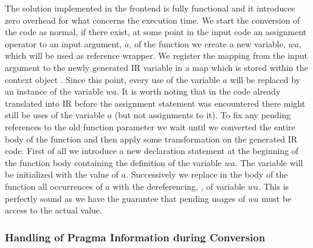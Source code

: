 The solution implemented in the frontend is fully functional and it introduces
zero overhead for what concerns the execution time. We start the conversion of
the code as normal, if there exist, at some point in the input code an
assignment operator to an input argument, $a$, of the function we create a new
variable, $wa$, which will be used as reference wrapper. We register the mapping
from the input argument to the newly generated IR variable in a map which is
stored within the context object . Since this point, every use
of the variable $a$ will be replaced by an instance of the variable $wa$. It is
worth noting that in the code already translated into IR before the assignment
statement was encountered there might still be uses of the variable $a$ (but not
assignments to it). To fix any pending references to the old function parameter
we wait until we converted the entire body of the function and then apply some
transformation on the generated IR code. First of all we introduce a new
declaration statement at the beginning of the function body containing the
definition of the variable $wa$. The variable will be initialized with the value
of $a$. Successively we replace in the body of the function all occurrences of
$a$ with the dereferencing, , of variable $wa$. This is
perfectly sound as we have the guarantee that pending usages of $wa$ must be
access to the actual value.


\subsubsection{Handling of Pragma Information during Conversion}




